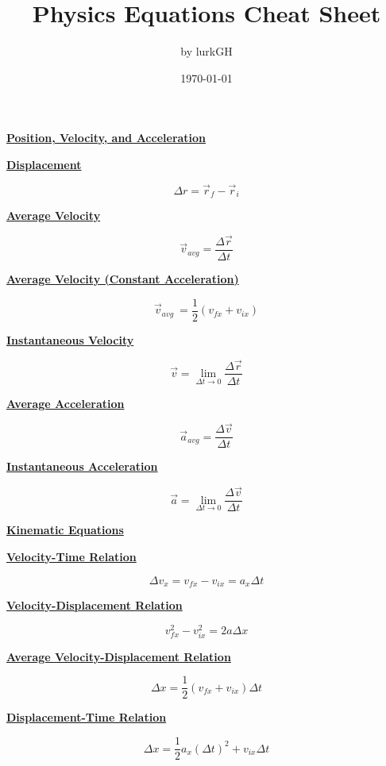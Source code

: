 \documentclass[12pt, letterpaper]{article}
\title{\textbf{Physics Equations Cheat Sheet}}
\author{by lurkGH}
\date{\today}
\begin{document}
\maketitle

\noindent\makebox[\linewidth]{\rule{\paperwidth}{0.4pt}}
\vspace{1em}

\Large{\centerline{\textbf{\underline{Position, Velocity, and Acceleration}}}}
\vspace{1em}

\normalsize{\centerline{\textbf{\underline{Displacement}}}}
\[\Delta r = \vec{r}_f - \vec{r}_i\]

\centerline{\textbf{\underline{Average Velocity}}}
\[\vec{v}_{avg} = \frac{\Delta \vec{r}}{\Delta t}\]

\centerline{\textbf{\underline{Average Velocity (Constant Acceleration)}}}
\[\vec{v}_{avg}\ = \frac{1}{2} (v_{fx} + v_{ix})\]

\centerline{\textbf{\underline{Instantaneous Velocity}}}
\[\vec{v} = \lim_{\Delta t \to 0} \frac{\Delta \vec{r}}{\Delta t}\]

\centerline{\textbf{\underline{Average Acceleration}}}
\[\vec{a}_{avg} = \frac{\Delta \vec{v}}{\Delta t}\]

\centerline{\textbf{\underline{Instantaneous Acceleration}}}
\[\vec{a} = \lim_{\Delta t \to 0} \frac{\Delta \vec{v}}{\Delta t}\]

\newpage

\Large{\centerline{\textbf{\underline{Kinematic Equations}}}}
\vspace{1em}

\normalsize{\centerline{\textbf{\underline{Velocity-Time Relation}}}}
\[\Delta v_x = v_{fx} - v_{ix} = a_x \Delta t\]

\centerline{\textbf{\underline{Velocity-Displacement Relation}}}
\[v^2_{fx} - v^2_{ix} = 2a \Delta x\]

\centerline{\textbf{\underline{Average Velocity-Displacement Relation}}}
\[\Delta x = \frac{1}{2} (v_{fx} + v_{ix}) \Delta t\]

\centerline{\textbf{\underline{Displacement-Time Relation}}}
\[\Delta x = \frac{1}{2} a_x (\Delta t)^2 + v_{ix} \Delta t\]
\end{document}
